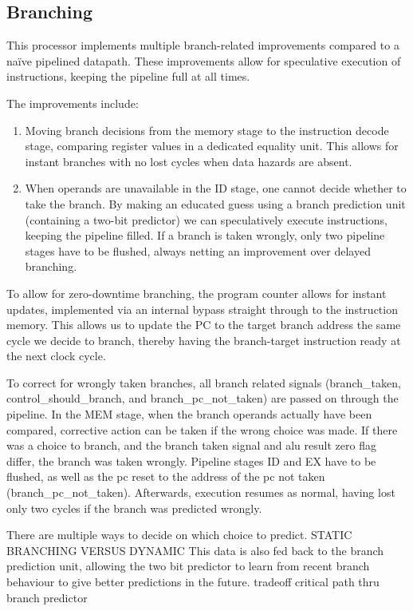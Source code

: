 \subsection{Branching}

This processor implements multiple branch-related improvements compared to a naïve pipelined datapath. These improvements allow for speculative execution of instructions, keeping the pipeline full at all times.

The improvements include:
\begin{enumerate}
  \item
    Moving branch decisions from the memory stage to the instruction decode stage, comparing register values in a dedicated equality unit.
    This allows for instant branches with no lost cycles when data hazards are absent.
  \item
    When operands are unavailable in the ID stage, one cannot decide whether to take the branch.
    By making an educated guess using a branch prediction unit (containing a two-bit predictor) we can speculatively execute instructions, keeping the pipeline filled.
    If a branch is taken wrongly, only two pipeline stages have to be flushed, always netting an improvement over delayed branching.
\end{enumerate}

To allow for zero-downtime branching, the program counter allows for instant updates, implemented via an internal bypass straight through to the instruction memory.
This allows us to update the PC to the target branch address the same cycle we decide to branch, thereby having the branch-target instruction ready at the next clock cycle.

To correct for wrongly taken branches, all branch related signals (branch\_taken, control\_should\_branch, and branch\_pc\_not\_taken) are passed on through the pipeline.
In the MEM stage, when the branch operands actually have been compared, corrective action can be taken if the wrong choice was made.
If there was a choice to branch, and the branch taken signal and alu result zero flag differ, the branch was taken wrongly.
Pipeline stages ID and EX have to be flushed, as well as the pc reset to the address of the pc not taken (branch\_pc\_not\_taken).
Afterwards, execution resumes as normal, having lost only two cycles if the branch was predicted wrongly.

There are multiple ways to decide on which choice to predict.
STATIC BRANCHING VERSUS DYNAMIC
This data is also fed back to the branch prediction unit, allowing the two bit predictor to learn from recent branch behaviour to give better predictions in the future.
tradeoff critical path thru branch predictor
